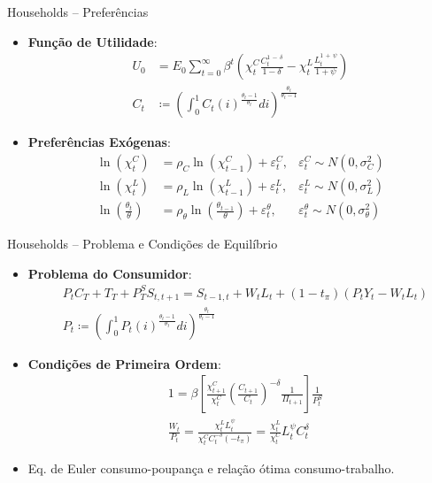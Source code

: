 \documentclass{beamer}
\begin{document}
\begin{frame}{Households -- Preferências}
    \begin{itemize}
        \item \textbf{Função de Utilidade}:
        \begin{align*}
            U_{0} &=E_{0}\sum_{t=0}^{\infty}\beta^{t}\left(\chi_{t}^{C}\frac{C_{t}^{1\,-\,\delta}}{1-\delta}-\chi_{t}^{L}\frac{L_{t}^{1\,+\,\psi}}{1+\psi}\right)\\
            C_t &\coloneqq \left(\int_0^1C_t(i)^{\frac{\theta_t - 1}{\theta_t}} di\right)^{\frac{\theta_t}{\theta_t - 1}}
        \end{align*}
        \item \textbf{Preferências Exógenas}:
        \begin{align*}
            \ln(\chi_{t}^{C}) &=\rho_{C}\ln(\chi_{t-1}^{C})+\varepsilon_{t}^{C}, &\varepsilon_{t}^{C} \sim N(0, \sigma^2_C) \tag{1}\\
            \ln(\chi_{t}^{L}) &=\rho_{L}\ln(\chi_{t-1}^{L})+\varepsilon_{t}^{L}, &\varepsilon_{t}^{L} \sim N(0, \sigma^2_L) \tag{2}\\
            \ln\left(\frac{\theta_t}{\theta}\right) &= \rho_\theta \ln\left(\frac{\theta_{t-1}}{\theta}\right) + \varepsilon^\theta_t, &\varepsilon_{t}^{\theta} \sim N(0, \sigma^2_\theta) \tag{10}
        \end{align*}
    \end{itemize}
\end{frame}

\begin{frame}{Households -- Problema e Condições de Equilíbrio}
    \begin{itemize}
        \item \textbf{Problema do Consumidor}:
        \begin{align*}
            &P_tC_T + T_T + P^S_TS_{t,t+1} = S_{t-1,t} + W_tL_t + (1-t_\pi)(P_tY_t - W_tL_t) \tag{3}\\
            &P_t \coloneqq \left(\int_0^1P_t(i)^{\frac{\theta_t - 1}{\theta_t}} di\right)^{\frac{\theta_t}{\theta_t - 1}}
        \end{align*}
        \item \textbf{Condições de Primeira Ordem}:
        \begin{align*}
            & 1 = \beta\left[\frac{\chi_{t+1}^C}{\chi_t^C} \left(\frac{C_{t+1}}{C_t}\right)^{-\delta}\frac{1}{\Pi_{t+1}}\right]\frac{1}{P_t^S} \tag{4}\\
            &\frac{W_t}{P_t} = \frac{\chi_t^L L_t^{\psi}}{\chi_t^C C_t^{-\delta}(-t_\pi)} = \frac{\chi_t^L }{\chi_t^C}L_t^{\psi}C_t^{\delta} \tag{5}
        \end{align*}
        \item Eq. de Euler consumo-poupança e relação ótima consumo-trabalho.
    \end{itemize}
\end{frame}
\end{document}
